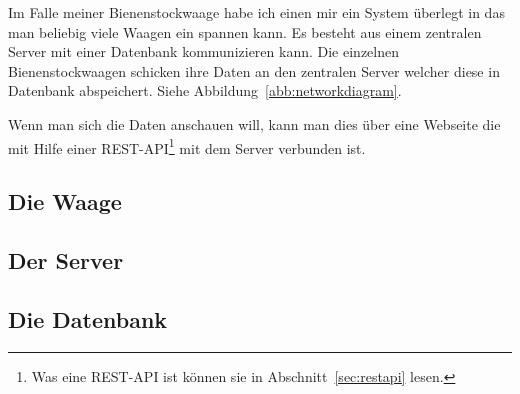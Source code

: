\documentclass[ngerman,12pt]{scrartcl}
\begin{document}
Im Falle meiner Bienenstockwaage habe ich einen mir ein System überlegt in das man beliebig viele Waagen ein spannen kann.
Es besteht aus einem zentralen Server mit einer Datenbank kommunizieren kann.
Die einzelnen Bienenstockwaagen schicken ihre Daten an den zentralen Server welcher diese in Datenbank abspeichert.
Siehe Abbildung~\ref{abb:networkdiagram}.

Wenn man sich die Daten anschauen will, kann man dies über eine Webseite die mit Hilfe einer REST-API\footnote{Was eine REST-API ist können sie in Abschnitt~\ref{sec:restapi} lesen.} mit dem Server verbunden ist.

\subsection{Die Waage}

\subsection{Der Server}

\subsection{Die Datenbank}

\printbibliography{}
\end{document}
